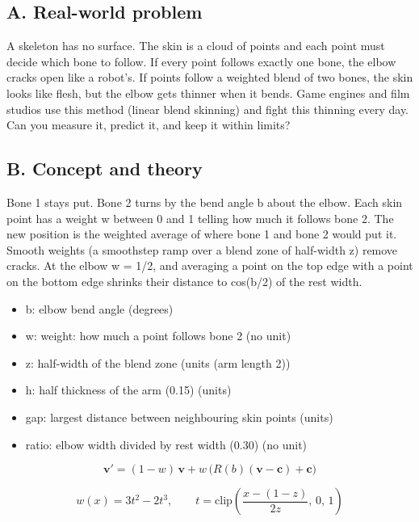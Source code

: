 \documentclass[11pt,a4paper]{article}
\begin{document}
\subsection*{A. Real-world problem}
A skeleton has no surface. The skin is a cloud of points and each point must decide which bone to follow. If every point follows exactly one bone, the elbow cracks open like a robot's. If points follow a weighted blend of two bones, the skin looks like flesh, but the elbow gets thinner when it bends. Game engines and film studios use this method (linear blend skinning) and fight this thinning every day. Can you measure it, predict it, and keep it within limits?

\subsection*{B. Concept and theory}
Bone 1 stays put. Bone 2 turns by the bend angle b about the elbow. Each skin point has a weight w between 0 and 1 telling how much it follows bone 2. The new position is the weighted average of where bone 1 and bone 2 would put it. Smooth weights (a smoothstep ramp over a blend zone of half-width z) remove cracks. At the elbow w = 1/2, and averaging a point on the top edge with a point on the bottom edge shrinks their distance to cos(b/2) of the rest width.

\begin{itemize}[nosep]
\item b: elbow bend angle (degrees)
\item w: weight: how much a point follows bone 2 (no unit)
\item z: half-width of the blend zone (units (arm length 2))
\item h: half thickness of the arm (0.15) (units)
\item gap: largest distance between neighbouring skin points (units)
\item ratio: elbow width divided by rest width (0.30) (no unit)
\end{itemize}

\begin{equation*}
\mathbf v'=(1-w)\,\mathbf v+w\,\big(R(b)(\mathbf v-\mathbf c)+\mathbf c\big)
\end{equation*}

\begin{equation*}
w(x)=3t^2-2t^3,\qquad t=\mathrm{clip}\!\left(\frac{x-(1-z)}{2z},\,0,\,1\right)
\end{equation*}
\end{document}
